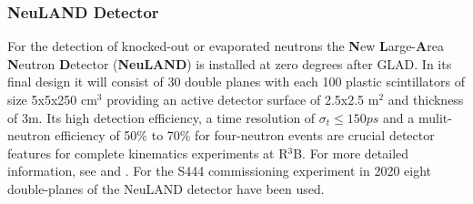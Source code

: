 \subsubsection{NeuLAND Detector}
For the detection of knocked-out or evaporated neutrons the \textbf{N}ew \textbf{L}arge-\textbf{A}rea \textbf{N}eutron \textbf{D}etector (\textbf{NeuLAND}) is installed at zero degrees after GLAD. In its final design it will consist of 30 double planes with each 100 plastic scintillators of size 5x5x250 cm$^3$ providing an active detector surface of 2.5x2.5 m$^2$ and thickness of 3m. Its high detection efficiency, a time resolution of $\sigma_t \le 150 ps$ and a mulit-neutron efficiency of 50\% to 70\% for four-neutron events are crucial detector features for complete kinematics experiments at R$^3$B. For more detailed information, see \cite{boretzky2021neuland} and \cite{boretzky2014neuland}.\newline
For the S444 commissioning experiment in 2020 eight double-planes of the NeuLAND detector have been used. 
\newpage


